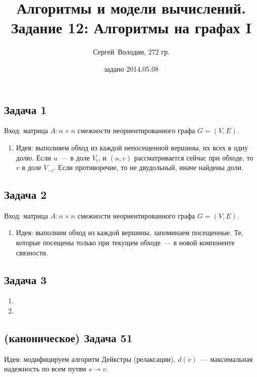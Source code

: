 \documentclass[a4paper]{article}
\date{задано 2014.05.08}
\author{Сергей~Володин, 272 гр.}
\title{Алгоритмы и модели вычислений.\\Задание 12: Алгоритмы на графах I}
\begin{document}
\maketitle
\subsection*{Задача 1}
Вход: матрица $A\colon n\times n$ смежности неориентированного графа $G=(V,E)$.
\begin{enumerate}
\item Идея: выполняем обход из каждой непосещенной вершины, их всех в одну долю. Если $u$~--- в доле $V_i$, и $(u,v)$ рассматривается сейчас при обходе, то $v$ в доле $V_{-i}$. Если противоречие, то не двудольный, иначе найдены доли.
\end{enumerate}
\subsection*{Задача 2}
Вход: матрица $A\colon n\times n$ смежности неориентированного графа $G=(V,E)$.
\begin{enumerate}
\item Идея: выполним обход из каждой вершины, запоминаем посещенные. Те, которые посещены только при текущем обходе~--- в новой компоненте связности.
\end{enumerate}
\subsection*{Задача 3}
\begin{enumerate}
\item
\item
\end{enumerate}
\subsection*{(каноническое) Задача 51}
Идея: модифицируем алгоритм Дейкстры (релаксации). $d(v)$~--- максимальная надежность по всем путям $s\to v$.
\end{document}
